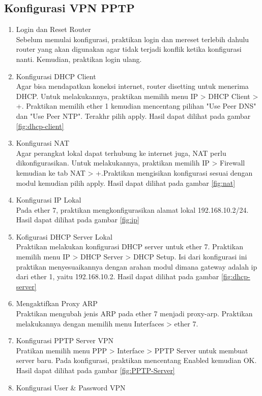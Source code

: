 \subsection{Konfigurasi VPN PPTP}
\begin{enumerate}
  \item Login dan Reset Router \\
  Sebelum memulai konfigurasi, praktikan login dan mereset terlebih dahulu router yang akan digunakan agar tidak terjadi konflik ketika konfigurasi nanti. Kemudian, praktikan login ulang.
  \item Konfigurasi DHCP Client \\
  Agar bisa mendapatkan koneksi internet, router disetting untuk menerima DHCP. Untuk melakukannya, praktikan memilih menu IP > DHCP Client > +. Praktikan memilih ether 1 kemudian mencentang pilihan "Use Peer DNS" dan "Use Peer NTP". Terakhr pilih apply. Hasil dapat dilihat pada gambar \ref{fig:dhcp-client}
  \item Konfigurasi NAT \\
  Agar perangkat lokal dapat terhubung ke internet juga, NAT perlu dikonfigurasikan. Untuk melakukannya, praktikan memilih IP > Firewall  kemudian ke tab NAT > +.Praktikan mengisikan konfigurasi sesuai dengan modul kemudian pilih apply. Hasil dapat dilihat pada gambar \ref{fig:nat}
  \item Konfigurasi IP Lokal \\
  Pada ether 7, praktikan mengkonfigurasikan alamat lokal 192.168.10.2/24. Hasil dapat dilihat pada gambar \ref{fig:ip}
  \item Kofigurasi DHCP Server Lokal \\
  Praktikan melakukan konfigurasi DHCP server untuk ether 7. Praktikan memilih menu IP > DHCP Server > DHCP Setup. Isi dari konfigurasi ini praktikan menyesuaikannya dengan arahan modul dimana gateway adalah ip dari ether 1, yaitu 192.168.10.2. Hasil dapat dilihat pada gambar \ref{fig:dhcp-server}
  \item Mengaktifkan Proxy ARP \\
  Praktikan mengubah jenis ARP pada ether 7 menjadi proxy-arp. Praktikan melakukannya dengan memilih menu Interfaces > ether 7.
  \item Konfigurasi PPTP Server VPN \\
  Pratikan memilih menu PPP > Interface > PPTP Server untuk membuat server baru. Pada konfigurasi, praktikan mencentang Enabled kemudian OK. Hasil dapat dilihat pada gambar \ref{fig:PPTP-Server}
  \item Konfigurasi User \& Password VPN\\

\end{enumerate}
